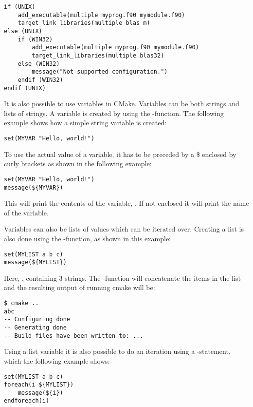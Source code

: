 \begin{lstlisting}
if (UNIX)
	add_executable(multiple myprog.f90 mymodule.f90)
	target_link_libraries(multiple blas m)
else (UNIX)
	if (WIN32)
		add_executable(multiple myprog.f90 mymodule.f90)
		target_link_libraries(multiple blas32)
	else (WIN32)
		message("Not supported configuration.")
	endif (WIN32)
endif (UNIX)
\end{lstlisting}

It is also possible to use variables in CMake. Variables can be both strings and lists of strings. A variable is created by using the -function. The following example shows how a simple string variable is created:

\begin{lstlisting}
set(MYVAR "Hello, world!")
\end{lstlisting}

To use the actual value of a variable, it has to be preceded by a \$ enclosed by curly brackets as shown in the following example:

\begin{lstlisting}
set(MYVAR "Hello, world!")
message(${MYVAR})
\end{lstlisting}

This will print the contents of the variable, . If not enclosed it will print the name of the variable.

Variables can also be lists of values which can be iterated over. Creating a list is also done using the -function, as shown in this example:

\begin{lstlisting}
set(MYLIST a b c)
message(${MYLIST})
\end{lstlisting}

Here, , containing 3 strings. The -function will concatenate the items in the list and the resulting output of running cmake will be:

\cmdmode

\begin{lstlisting}
$ cmake ..
abc
-- Configuring done
-- Generating done
-- Build files have been written to: ...
\end{lstlisting}

Using a list variable it is also possible to do an iteration using a -statement, which the following example shows:

\cmmode

\begin{lstlisting}
set(MYLIST a b c)
foreach(i ${MYLIST})
	message(${i})
endforeach(i)
\end{lstlisting}

